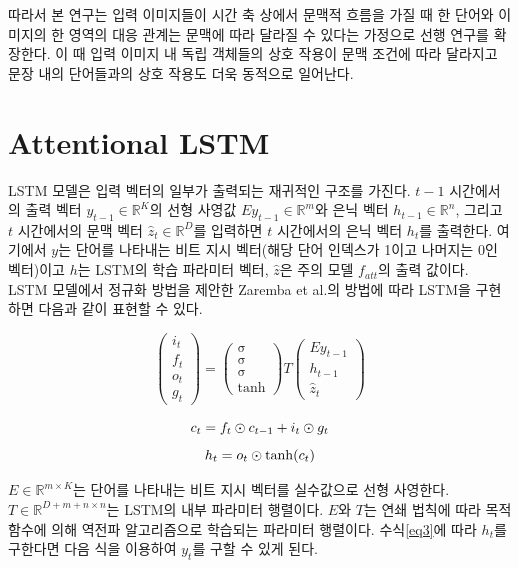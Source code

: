 \documentclass{kcc}
\begin{document}
따라서 본 연구는 입력 이미지들이 시간 축 상에서 문맥적 흐름을 가질 때 한 단어와 이미지의 한 영역의 대응 관계는 문맥에 따라 달라질 수 있다는 가정으로 선행 연구를 확장한다. 이 때 입력 이미지 내 독립 객체들의 상호 작용이 문맥 조건에 따라 달라지고 문장 내의 단어들과의 상호 작용도 더욱 동적으로 일어난다. 

\section{Attentional LSTM}

LSTM 모델은 입력 벡터의 일부가 출력되는 재귀적인 구조를 가진다. $t-1$ 시간에서의 출력 벡터 $y_{t-1} \in \mathbb{R}^K$의 선형 사영값 $Ey_{t-1} \in \mathbb{R}^m$와 은닉 벡터 $h_{t-1} \in \mathbb{R}^n$, 그리고 $t$ 시간에서의 문맥 벡터 $\hat{z}_t \in \mathbb{R}^D$를 입력하면 $t$ 시간에서의 은닉 벡터 $h_t$를 출력한다. 여기에서 $y$는 단어를 나타내는 비트 지시 벡터(해당 단어 인덱스가 1이고 나머지는 0인 벡터)이고 $h$는 LSTM의 학습 파라미터 벡터, $\hat{z}$은 주의 모델 $f_{att}$의 출력 값이다. LSTM 모델에서 정규화 방법을 제안한 Zaremba et al.\cite{Zaremba2015}의 방법에 따라 LSTM을 구현하면 다음과 같이 표현할 수 있다.

\begin{equation}
\begin{pmatrix}i_{t}\\f_{t}\\o_{t}\\g_{t}\end{pmatrix} =
  \begin{pmatrix}\mathrm{\sigma}\\\mathrm{\sigma}\\\mathrm{\sigma}\\\tanh\end{pmatrix}
  T
  \begin{pmatrix}Ey_{t-1}\\h_{t-1}\\\hat{z}_t\end{pmatrix}
\end{equation}

\begin{equation}
c_t = f_t \odot c_{t-1} + i_t \odot g_t\\
\end{equation}
\begin{equation}
\label{eq3}
h_t = o_t \odot \tanh(c_t)\\
\end{equation}

$E \in \mathbb{R}^{m \times K}$는 단어를 나타내는 비트 지시 벡터를 실수값으로 선형 사영한다.  $T \in \mathbb{R}^{D+m+n \times n}$는 LSTM의 내부 파라미터 행렬이다. $E$와 $T$는 연쇄 법칙에 따라 목적 함수에 의해 역전파 알고리즘으로 학습되는 파라미터 행렬이다. 수식\ref{eq3}에 따라 $h_t$를 구한다면 다음 식을 이용하여 $y_t$를 구할 수 있게 된다.
\end{document}
